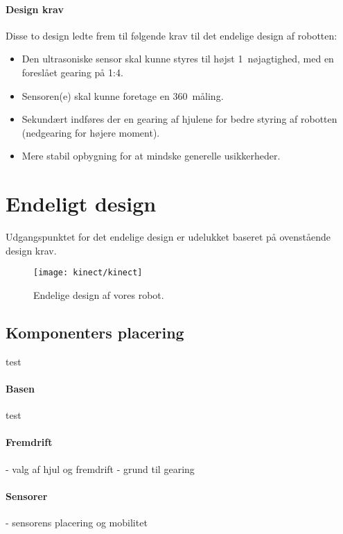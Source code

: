 \paragraph{Design krav}
Disse to design ledte frem til følgende krav til det endelige design af robotten:

\begin{itemize}
\item Den ultrasoniske sensor skal kunne styres til højst 1\degree~nøjagtighed, med en foreslået gearing på 1:4.
\item Sensoren(e) skal kunne foretage en 360\degree~måling.
\item Sekundært indføres der en gearing af hjulene for bedre styring af robotten (nedgearing for højere moment).
\item Mere stabil opbygning for at mindske generelle usikkerheder.
\end{itemize} 


\section{Endeligt design}
Udgangspunktet for det endelige design er udelukket baseret på ovenstående design krav. 


\begin{figure}
\centering
\texttt{[image: kinect/kinect]}
\caption{Endelige design af vores robot.}
\label{robot:opbygning}
\end{figure}

\subsection{Komponenters placering}
test

\paragraph{Basen}
test

\paragraph{Fremdrift}
- valg af hjul og fremdrift
- grund til gearing

\paragraph{Sensorer}
- sensorens placering og mobilitet
